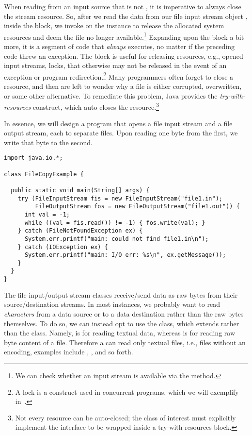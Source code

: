 When reading from an input source that is not , it is imperative to always close the stream resource.
So, after we read the data from our file input stream object , inside the  block, we invoke  on the instance to release the allocated system resources and deem the file no longer available.\footnote{We can check whether an input stream is available via the  method.} 
Expanding upon the  block a bit more, it is a segment of code that \emph{always} executes, no matter if the preceding code threw an exception. 
The  block is useful for releasing resources, e.g., opened input streams, locks, that otherwise may not be released in the event of an exception or program redirection.\footnote{A lock is a construct used in concurrent programs, which we will exemplify in~.} 
Many programmers often forget to close a resource, and then are left to wonder why a file is either corrupted, overwritten, or some other alternative. 
To remediate this problem, Java provides the \emph{try-with-resources} construct, which auto-closes the resource.\footnote{Not every resource can be auto-closed; the class of interest must explicitly implement the  interface to be wrapped inside a try-with-resources block.}

In essence, we will design a program that opens a file input stream and a file output stream, each to separate files. Upon reading one byte from the first, we write that byte to the second.

\begin{lstlisting}[language=MyJava]
import java.io.*;

class FileCopyExample {

  public static void main(String[] args) {
    try (FileInputStream fis = new FileInputStream("file1.in");
         FileOutputStream fos = new FileOutputStream("file1.out")) {
      int val = -1;
      while ((val = fis.read()) != -1) { fos.write(val); }
    } catch (FileNotFoundException ex) {
      System.err.printf("main: could not find file1.in\n");
    } catch (IOException ex) {
      System.err.printf("main: I/O err: %s\n", ex.getMessage());
    }
  }
}
\end{lstlisting}

The file input/output stream classes receive/send data as raw bytes from their source/destination streams.
In most instances, we probably want to read \emph{characters} from a data source or to a data destination rather than the raw bytes themselves.
To do so, we can instead opt to use the  class, which extends  rather than the  class. 
Namely,  is for reading textual data, whereas  is for reading raw byte content of a file. 
Therefore a  can read only textual files, i.e., files without an encoding, examples include , , and so forth.

